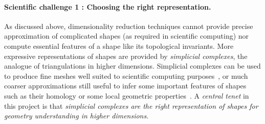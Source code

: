 \paragraph{Scientific challenge 1 :  Choosing the right representation.}


As discussed above, dimensionality reduction techniques cannot provide precise approximation of complicated shapes (as required in scientific computing) nor compute essential features of a shape like its topological invariants.
More expressive representations of shapes are provided %
by {\em simplicial complexes}, the analogue of triangulations in higher dimensions.
 Simplicial complexes can be used to produce fine meshes well suited to scientific computing purposes~\cite{boissonnat2010meshing}, or much coarser approximations still useful to infer some important features of shapes such as their homology or some local geometric properties~\cite{geometrica-ccl09,nsw-fhm-2008}. 
 A {\em central tenet} in this project is that {\em simplicial complexes are the right representation of shapes for geometry understanding in higher dimensions}.%


